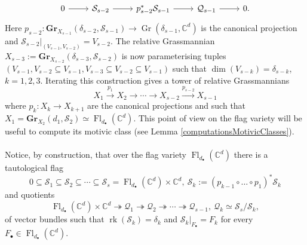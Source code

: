 \documentclass{amsart}
\theoremstyle{plain}
\numberwithin{equation}{section}
\theoremstyle{definition}
\theoremstyle{remark}
\begin{document}
	\begin{equation}\label{tautologicalExactSequenceRelativeGrassmannian}
		\begin{tikzcd}[column sep =normal, row sep =normal]
			0\arrow[r]&\mathcal{S}_{s-2}\arrow[r]&p_{s-2}^*\mathcal{S}_{s-1} \arrow[r]&\mathcal{Q}_{s-1}\arrow[r]&0.
		\end{tikzcd}
	\end{equation}
	Here $p_{s-2}:\mathbf{Gr}_{X_{s-1}}(\delta_{s-2},\mathcal{S}_{s-1})\to \operatorname{Gr}(\delta_{s-1},\mathbb{C}^d)$ is the canonical projection and $\mathcal{S}_{s-2}|_{(V_{s-1},V_{s-2})}=V_{s-2}$. The relative Grassmannian $X_{s-3}:=\mathbf{Gr}_{X_{s-2}}(\delta_{s-3},\mathcal{S}_{s-2})$ is now parameterising tuples $(V_{s-1},V_{s-2}\subseteq V_{s-1},V_{s-3}\subseteq V_{s-2}\subseteq V_{s-1})$ such that $\dim(V_{s-k})=\delta_{s-k}$, $k=1,2,3$. Iterating this construction gives a tower of relative Grassmannians
	$$
	X_1\overset{p_1}{\longrightarrow}X_2\longrightarrow\cdots\longrightarrow X_{s-2} \overset{p_{s-2}}{\longrightarrow} X_{s-1}
	$$
	 where $p_k:X_{k}\to X_{k+1}$ are the canonical projections and such that $X_1=\mathbf{Gr}_{X_2}(d_1,\mathcal{S}_2)\simeq \operatorname{Fl}_{d_\bullet}(\mathbb{C}^d)$. This point of view on the flag variety will be useful to compute its motivic class (see Lemma \ref{computationsMotivicClasses}). 
	\\
	\\
	Notice, by construction, that over the flag variety $\operatorname{Fl}_{d_\bullet}(\mathbb{C}^d)$ there is a tautological flag
	\begin{equation}\label{tautologicalFlagOverFlagVariety}
		0\subseteq \mathscr{S}_{1}\subseteq\mathscr{S}_{2}\subseteq\cdots\subseteq \mathscr{S}_{s}=\operatorname{Fl}_{d_{\bullet}}(\mathbb{C}^{d})\times\mathbb{C}^{d}, \ \mathscr{S}_k:=(p_{k-1}\circ \ldots\circ p_{1})^*\mathcal{S}_{k} 
	\end{equation}
	and quotients 
	\begin{equation}\label{tautologicalQuotientsOverFlagVariety}
		\operatorname{Fl}_{d_{\bullet}}(\mathbb{C}^{d})\times\mathbb{C}^{d} \twoheadrightarrow \mathscr{Q}_{1}\twoheadrightarrow \mathscr{Q}_{2}\twoheadrightarrow\cdots\twoheadrightarrow \mathscr{Q}_{s-1}, \ \mathscr{Q}_{k}\simeq \mathscr{S}_{s}/\mathscr{S}_{k},
	\end{equation}
	of vector bundles such that $\operatorname{rk}(\mathscr{S}_{k})=\delta_{k}$ and $\mathscr{S}_{k}|_{F_{\bullet}}=F_{k}$ for every $F_{\bullet}\in\operatorname{Fl}_{d_{\bullet}}(\mathbb{C}^{d})$. 
\end{document}
